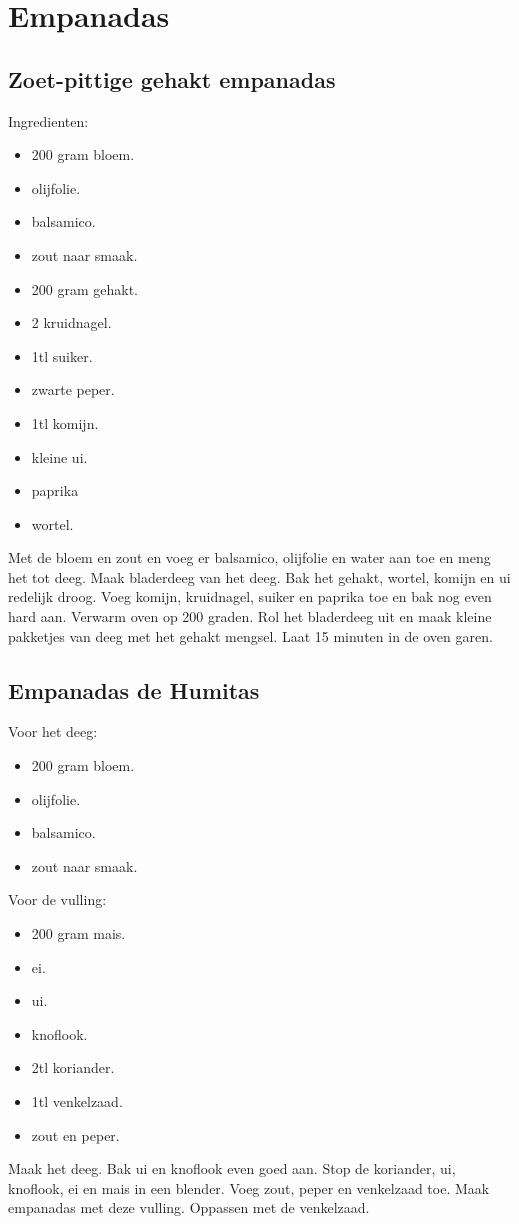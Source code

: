 \section{Empanadas}

\subsection{Zoet-pittige gehakt empanadas}

Ingredienten:
\begin{itemize}
\item 200 gram bloem.
\item olijfolie.
\item balsamico.
\item zout naar smaak.
\item 200 gram gehakt.
\item 2 kruidnagel.
\item 1tl suiker.
\item zwarte peper.
\item 1tl komijn.
\item kleine ui.
\item paprika
\item wortel.
\end{itemize}

Met de bloem en zout en voeg er balsamico, olijfolie en water aan toe en meng het tot deeg.
Maak bladerdeeg van het deeg.
Bak het gehakt, wortel, komijn en ui redelijk droog.
Voeg komijn, kruidnagel, suiker en paprika toe en bak nog even hard aan.
Verwarm oven op 200 graden.
Rol het bladerdeeg uit en maak kleine pakketjes van deeg met het gehakt mengsel.
Laat 15 minuten in de oven garen.

\subsection{Empanadas de Humitas}

Voor het deeg:
\begin{itemize}
\item 200 gram bloem.
\item olijfolie.
\item balsamico.
\item zout naar smaak.
\end{itemize}

Voor de vulling:
\begin{itemize}
\item 200 gram mais.
\item ei.
\item ui.
\item knoflook.
\item 2tl koriander.
\item 1tl venkelzaad.
\item zout en peper.
\end{itemize}

Maak het deeg.
Bak ui en knoflook even goed aan.
Stop de koriander, ui, knoflook, ei en mais in een blender.
Voeg zout, peper en venkelzaad toe.
Maak empanadas met deze vulling.
Oppassen met de venkelzaad.
